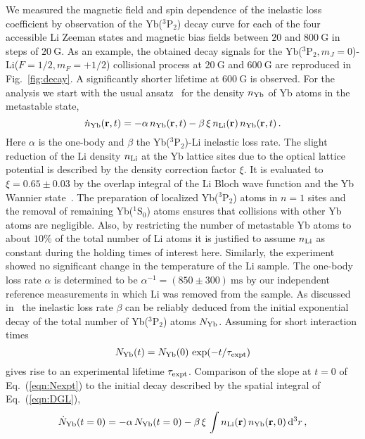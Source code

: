 \documentclass[twocolumn,superscriptaddress,showpacs,floatfix,amsmath,amssymb]{revtex4-1}
\newcommand{\singlet}{{}^1\mathrm{S}_0}
\newcommand{\triplet}{{}^3\mathrm{P}_2}
\newcommand{\msec}{\mathrm{ms}}
\newcommand{\G}{\mathrm{G}}
\begin{document}
We measured the magnetic field and spin dependence of the inelastic loss
coefficient by observation of the Yb($\triplet$) decay curve for each of the
four accessible Li Zeeman states and magnetic bias fields between $20$ and
$800~\G$ in steps of $20~\G$. As an example, the obtained decay signals for
the Yb($\triplet, m_J = 0$)-Li($F = 1/2, m_F = +1/2$) collisional process at
$20~\G$ and $600~\G$ are reproduced in Fig.~\ref{fig:decay}. A significantly
shorter lifetime at $600~\G$ is observed. For the analysis we start with the
usual ansatz~\cite{konishi_collisional_2016, schafer_spin_2017} for the
density $n_{\rm Yb}$ of Yb atoms in the metastable state,
\begin{equation}
	\dot{n}_{\rm Yb}({\bf r}, t) = - \alpha\, n_{\rm Yb}({\bf r}, t) - \beta\,
	\xi\, n_{\rm Li}({\bf r})\, n_{\rm Yb}({\bf r}, t)\, .
	\label{eqn:DGL}
\end{equation}
Here $\alpha$ is the one-body and $\beta$ the Yb($\triplet$)-Li inelastic loss
rate. The slight reduction of the Li density $n_{\rm Li}$ at the Yb lattice
sites due to the optical lattice potential is described by the density
correction factor $\xi$. It is evaluated to $\xi = 0.65 \pm 0.03$ by the
overlap integral of the Li Bloch wave function and the Yb Wannier
state~\cite{konishi_collisional_2016}. The preparation of localized
Yb($\triplet$) atoms in $n = 1$ sites and the removal of remaining
Yb($\singlet$) atoms ensures that collisions with other Yb atoms are
negligible. Also, by restricting the number of metastable Yb atoms to about
$10\%$ of the total number of Li atoms it is justified to assume $n_{\rm Li}$
as constant during the holding times of interest here. Similarly, the
experiment showed no significant change in the temperature of the Li sample.
The one-body loss rate $\alpha$ is determined to be $\alpha^{-1} = (850
\pm 300)~\msec$ by our independent reference measurements in which Li was
removed from the sample. As discussed in~\cite{schafer_spin_2017} the
inelastic loss rate $\beta$ can be reliably deduced from the initial
exponential decay of the total number of Yb($\triplet$) atoms $N_{\rm Yb}$.
Assuming for short interaction times
\begin{equation}
	N_{\rm Yb}(t) = N_{\rm Yb}(0)\, \exp(-t/\tau_{\rm expt})
	\label{eqn:Nexpt}
\end{equation}
gives rise to an experimental lifetime $\tau_{\rm expt}$. Comparison of the
slope at $t = 0$ of Eq.~(\ref{eqn:Nexpt}) to the initial decay described by
the spatial integral of Eq.~(\ref{eqn:DGL}),
\begin{equation}
	\dot{N}_{\rm Yb}(t = 0) = - \alpha\, N_{\rm Yb}(t=0) - \beta\, \xi\, \int
	n_{\rm Li}({\bf r})\, n_{\rm Yb}({\bf r}, 0)\, {\rm d}^3r\, ,
	\label{eqn:initialDecay}
\end{equation}
\end{document}
